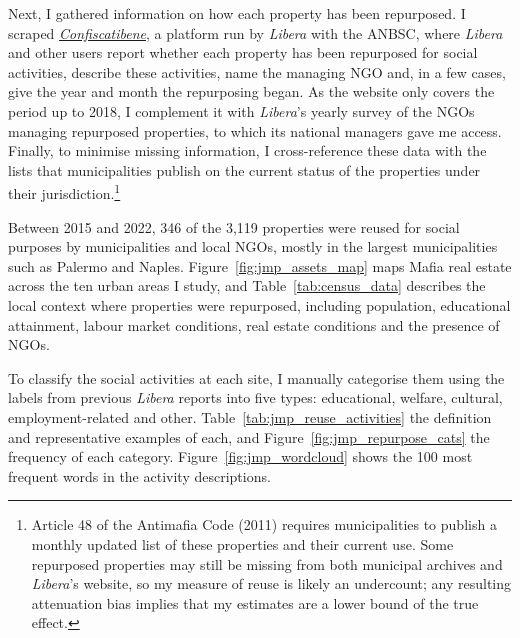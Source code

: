 \documentclass[12pt]{article}
\theoremstyle{plain}
\theoremstyle{plain}
\theoremstyle{plain}
\theoremstyle{definition}
\theoremstyle{plain}
\theoremstyle{definition}
\theoremstyle{plain}
\theoremstyle{remark}
\theoremstyle{definition}
\theoremstyle{definition}
\theoremstyle{plain}
\begin{document}
Next, I gathered information on how each property has been repurposed. I scraped \emph{\href{https://www.confiscatibene.it/}{Confiscatibene}}, a platform run by \emph{Libera} with the ANBSC, where \emph{Libera} and other users report whether each property has been repurposed for social activities, describe these activities, name the managing NGO and, in a few cases, give the year and month the repurposing began. As the website only covers the period up to 2018, I complement it with \emph{Libera}'s yearly survey of the NGOs managing repurposed properties, to which its national managers gave me access. Finally, to minimise missing information, I cross-reference these data with the lists that municipalities publish on the current status of the properties under their jurisdiction.\footnote{Article 48 of the Antimafia Code (2011) requires municipalities to publish a monthly updated list of these properties and their current use. Some repurposed properties may still be missing from both municipal archives and \emph{Libera}'s website, so my measure of reuse is likely an undercount; any resulting attenuation bias implies that my estimates are a lower bound of the true effect.} \par

Between 2015 and 2022, 346 of the 3,119 properties were reused for social purposes by municipalities and local NGOs, mostly in the largest municipalities such as Palermo and Naples. Figure~\ref{fig:jmp_assets_map} maps Mafia real estate across the ten urban areas I study, and Table~\ref{tab:census_data} describes the local context where properties were repurposed, including population, educational attainment, labour market conditions, real estate conditions and the presence of NGOs. \par

To classify the social activities at each site, I manually categorise them using the labels from previous \emph{Libera} reports \citep{falcone_beneitalia_2016} into five types: educational, welfare, cultural, employment-related and other. Table~\ref{tab:jmp_reuse_activities} the definition and representative examples of each, and Figure~\ref{fig:jmp_repurpose_cats} the frequency of each category. Figure~\ref{fig:jmp_wordcloud} shows the 100 most frequent words in the activity descriptions. \par
\end{document}
